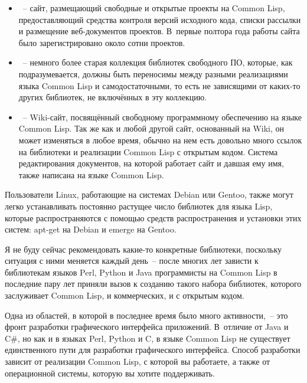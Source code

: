 \begin{itemize}
\item {}~-- сайт, размещающий свободные
  и открытые проекты на Common Lisp, предоставляющий средства контроля версий исходного кода,
  списки рассылки и размещение веб-документов проектов. В~первые полтора года работы сайта
  было зарегистрировано около сотни проектов.

\item {}~-- немного более старая коллекция библиотек
  свободного ПО, которые, как подразумевается, должны быть переносимы между разными
  реализациями языка Common Lisp и самодостаточными, то есть не зависящими от каких-то
  других библиотек, не включённых в эту коллекцию.

\item {}~-- Wiki-сайт, посвящённый
  свободному программному обеспечению на языке Common Lisp. Так же как и любой другой
  сайт, основанный на Wiki, он может изменяться в любое время, обычно на нем есть довольно
  много ссылок на библиотеки и реализации Common Lisp с открытым кодом. Система
  редактирования документов, на которой работает сайт и давшая ему имя, также написана на
  языке Common Lisp.
\end{itemize}

Пользователи Linux, работающие на системах Debian или Gentoo, также могут легко
устанавливать постоянно растущее число библиотек для языка Lisp, которые распространяются
с помощью средств распространения и установки этих систем: apt-get на Debian и emerge на
Gentoo.

Я не буду сейчас рекомендовать какие-то конкретные библиотеки, поскольку си\-туа\-ция с ними
меняется каждый день~-- после многих лет зависти к библиотекам языков Perl, Python и
Java программисты на Common Lisp в последние пару лет приняли вызов к созданию такого
набора библиотек, которого заслуживает Common Lisp, и коммерческих, и с открытым кодом.

Одна из областей, в которой в последнее время было много активности,~-- это фронт
разработки графического интерфейса приложений. В~отличие от Java и C\#, но как и в языках
Perl, Python и C, в языке Common Lisp не существует единственного пути для разработки
графического интерфейса. Способ разработки зависит от реализации Common Lisp, с которой вы
работаете, а также от операционной системы, которую вы хотите поддерживать.

